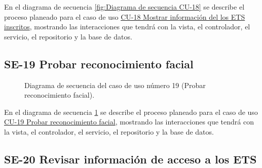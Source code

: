 En el diagrama de secuencia \ref{fig:Diagrama de secuencia CU-18} se describe el proceso planeado para el caso de uso \hyperlink{CU-18}{CU-18 Mostrar información del los ETS inscritos}, mostrando las interacciones que tendrá con la vista, el controlador, el servicio, el repositorio y la base de datos.

\newpage

\subsection{SE-19 Probar reconocimiento facial}

\begin{figure}[htbp!]
	\begin{center}
		\caption{Diagrama de secuencia del caso de uso número 19 (Probar reconocimiento facial).}
		\label{fig:Diagrama de secuencia CU-19}
	\end{center}
\end{figure}

En el diagrama de secuencia \ref{fig:Diagrama de secuencia CU-19} se describe el proceso planeado para el caso de uso \hyperlink{CU-19}{CU-19 Probar reconocimiento facial}, mostrando las interacciones que tendrá con la vista, el controlador, el servicio, el repositorio y la base de datos.

\newpage

\subsection{SE-20 Revisar información de acceso a los ETS}

